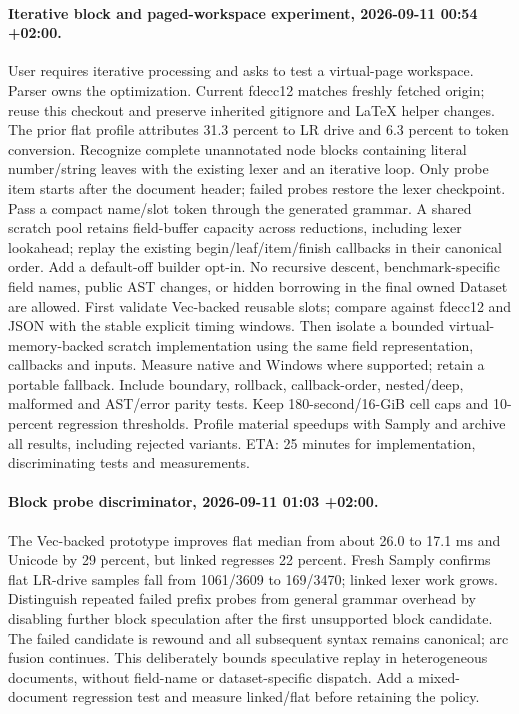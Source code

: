 \documentclass[11pt,a4paper]{article}
\begin{document}
\paragraph{Iterative block and paged-workspace experiment, 2026-09-11 00:54 +02:00.}
User requires iterative processing and asks to test a virtual-page workspace.
Parser owns the optimization. Current fdecc12 matches freshly fetched origin;
reuse this checkout and preserve inherited gitignore and LaTeX helper changes.
The prior flat profile attributes 31.3 percent to LR drive and 6.3 percent to
token conversion. Recognize complete unannotated node blocks containing literal
number/string leaves with the existing lexer and an iterative loop. Only probe
item starts after the document header; failed probes restore the lexer checkpoint.
Pass a compact name/slot token through the generated grammar. A shared scratch pool
retains field-buffer capacity across reductions, including lexer lookahead; replay
the existing begin/leaf/item/finish callbacks in their canonical order. Add a
default-off builder opt-in. No recursive descent, benchmark-specific field names,
public AST changes, or hidden borrowing in the final owned Dataset are allowed.
First validate Vec-backed reusable slots; compare against fdecc12 and JSON with
the stable explicit timing windows. Then isolate a bounded virtual-memory-backed
scratch implementation using the same field representation, callbacks and inputs.
Measure native and Windows where supported; retain a portable fallback. Include
boundary, rollback, callback-order, nested/deep, malformed and AST/error parity
tests. Keep 180-second/16-GiB cell caps and 10-percent regression thresholds.
Profile material speedups with Samply and archive all results, including rejected
variants. ETA: 25 minutes for implementation, discriminating tests and measurements.

\paragraph{Block probe discriminator, 2026-09-11 01:03 +02:00.}
The Vec-backed prototype improves flat median from about 26.0 to 17.1 ms and
Unicode by 29 percent, but linked regresses 22 percent. Fresh Samply confirms
flat LR-drive samples fall from 1061/3609 to 169/3470; linked lexer work grows.
Distinguish repeated failed prefix probes from general grammar overhead by
disabling further block speculation after the first unsupported block candidate.
The failed candidate is rewound and all subsequent syntax remains canonical;
arc fusion continues. This deliberately bounds speculative replay in heterogeneous
documents, without field-name or dataset-specific dispatch. Add a mixed-document
regression test and measure linked/flat before retaining the policy.
\end{document}
